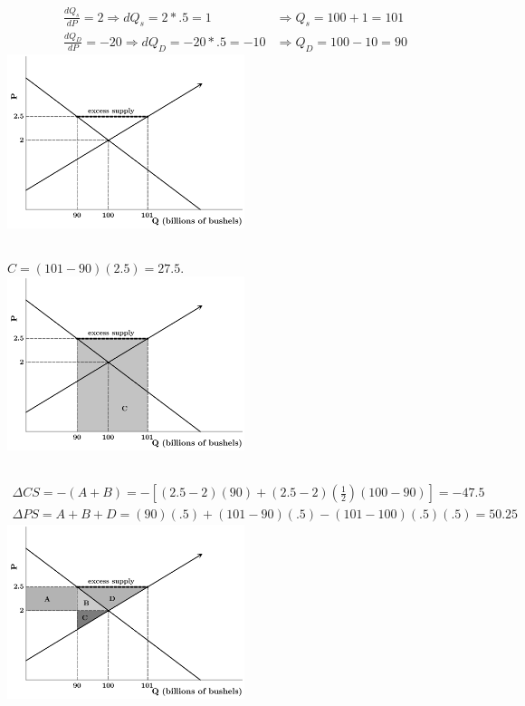 \documentclass{article}
\begin{document}
	\subsection[b]{}
		\begin{align*}
			\frac{dQ_s}{dP}=2 \Rightarrow dQ_s = 2*.5 = 1 &\Rightarrow Q_s = 100+1 = 101\\
			\frac{dQ_D}{dP} = -20 \Rightarrow dQ_D = -20 * .5 = -10	&\Rightarrow Q_D = 100-10 = 90
		\end{align*}
		\includegraphics[height=2in]{Charts/6b}
	\subsection[c]{}
		$C = (101-90)(2.5) = 27.5.$\\
		\includegraphics[height=2in]{Charts/6c}
	\subsection[d]{}
		\begin{align*}
			\Delta CS = -(A+B) = -\left [ (2.5-2)(90) + (2.5-2) \left ( \frac{1}{2} \right ) (100-90) \right ] = -47.5\\
			\Delta PS = A+B+D = (90)(.5)+(101-90)(.5)-(101-100)(.5)(.5) = 50.25 
		\end{align*}
		\includegraphics[height=2in]{Charts/6d}
\end{document}
